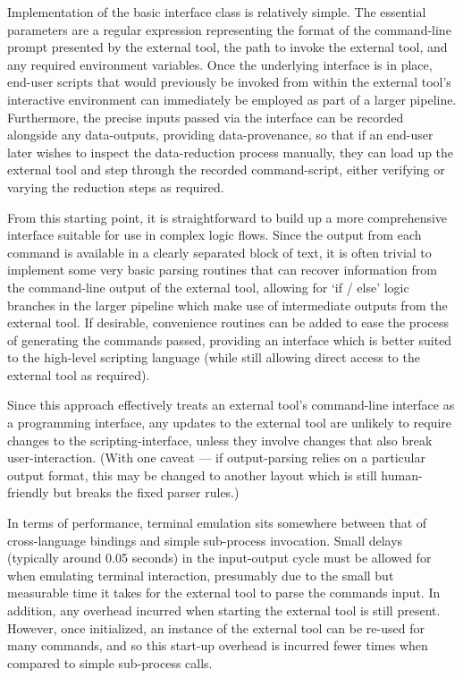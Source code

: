 \documentclass[5p,authoryear]{elsarticle}
\begin{document}
Implementation of the basic interface class is relatively simple. 
The essential parameters are a regular expression representing the format of the command-line prompt presented by the external tool, the path to invoke the external tool, and any required environment variables.
Once the underlying interface is in place, end-user scripts that would previously be invoked from within the external tool's interactive environment can immediately be employed as part of a larger pipeline. 
Furthermore, the precise inputs passed via the interface can be recorded alongside any data-outputs, providing data-provenance, so that if an end-user later wishes to inspect the data-reduction process manually, they can load up the external tool and step through the recorded command-script, either verifying or varying the reduction steps as required.

From this starting point, it is straightforward to build up a more comprehensive interface suitable for use in complex logic flows. Since the output from each command is available in a clearly separated block of text, it is often trivial to implement some very basic parsing routines that can recover information from the command-line output of the external tool, allowing for `if / else' logic branches in the larger pipeline which make use of intermediate outputs from the external tool. 
If desirable, convenience routines can be added to ease the process of generating the commands passed, providing an interface which is better suited to the high-level scripting language (while still allowing direct access to the external tool as required).

Since this approach effectively treats an external tool's command-line interface as a programming interface, any updates to the external tool are unlikely to require changes to the scripting-interface, unless they involve changes that also break user-interaction. 
(With one caveat --- if output-parsing relies on a particular output format, this may be changed to another layout which is still human-friendly but breaks the fixed parser rules.)

In terms of performance, terminal emulation sits somewhere between that of cross-language bindings and simple sub-process invocation. 
Small delays (typically around 0.05 seconds) in the input-output cycle must be allowed for when emulating terminal interaction, presumably due to the small but measurable time it takes for the external tool to parse the commands input. In addition, any overhead incurred when starting the external tool is still present. 
However, once initialized, an instance of the external tool can be re-used for many commands, and so this start-up overhead is incurred fewer times when compared to simple sub-process calls. 
\end{document}
